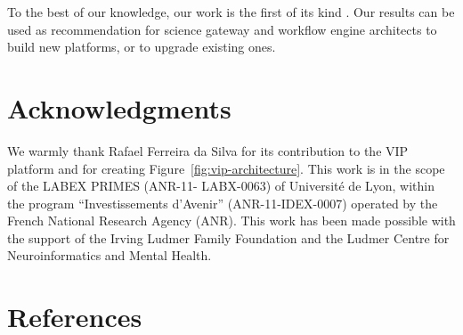 \documentclass[preprint,3p,twocolumn]{elsarticle}
\newcommand{\note}[2]{\pdfmargincomment[color=yellow,author=#1,open=true]{#2}}
\begin{document}
To the best of our knowledge, our work is the first of its kind
\note{Tristan}{Be more accurate}. Our results can be used as
recommendation for science gateway and workflow engine architects to
build new platforms, or to upgrade existing ones.

\section{Acknowledgments}

We warmly thank Rafael Ferreira da Silva for its contribution to the
VIP platform and for creating Figure~\ref{fig:vip-architecture}. This
work is in the scope of the LABEX PRIMES (ANR-11- LABX-0063) of
Universit\'e de Lyon, within the program ``Investissements d’Avenir''
(ANR-11-IDEX-0007) operated by the French National Research Agency
(ANR). This work has been made possible with the support of the Irving
Ludmer Family Foundation and the Ludmer Centre for Neuroinformatics
and Mental Health.

\section*{References}



\end{document}
